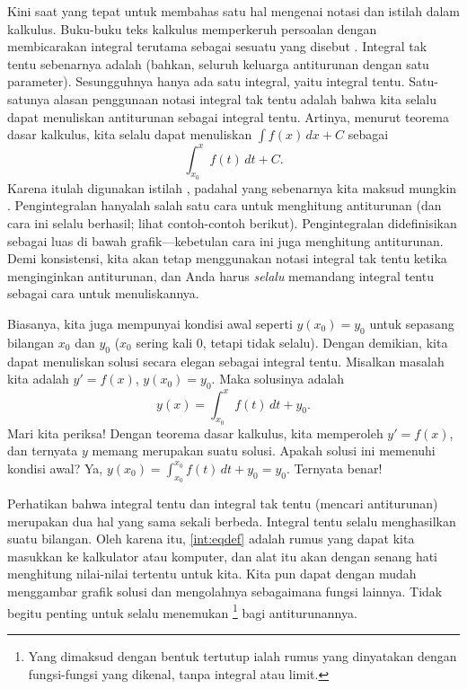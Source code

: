 Kini saat yang tepat untuk membahas satu hal mengenai
notasi dan istilah dalam kalkulus. Buku-buku teks kalkulus
memperkeruh persoalan dengan membicarakan integral terutama sebagai sesuatu
yang disebut . Integral tak tentu
sebenarnya adalah \emph{}
(bahkan, seluruh keluarga antiturunan
dengan satu parameter). Sesungguhnya hanya ada satu integral, yaitu
integral tentu.
Satu-satunya alasan penggunaan notasi integral tak tentu adalah bahwa kita selalu dapat
menuliskan antiturunan sebagai integral tentu. Artinya, menurut teorema dasar
kalkulus, kita selalu dapat menuliskan
$\int f(x) \,dx + C$ sebagai
\begin{equation*}
\int_{x_0}^x f(t) \,dt + C .
\end{equation*}
Karena itulah digunakan istilah \emph{}, padahal yang sebenarnya kita maksud mungkin
\emph{}.
Pengintegralan hanyalah salah satu cara untuk menghitung
antiturunan (dan cara ini selalu berhasil; lihat
contoh-contoh berikut). Pengintegralan didefinisikan sebagai luas di bawah grafik---kebetulan
cara ini juga menghitung antiturunan.
Demi konsistensi, kita akan tetap menggunakan
notasi integral tak tentu ketika menginginkan antiturunan,
dan Anda harus \emph{selalu} memandang integral tentu
sebagai cara untuk menuliskannya.

Biasanya, kita juga mempunyai kondisi awal seperti $y(x_0) = y_0$
untuk sepasang bilangan $x_0$ dan $y_0$ ($x_0$ sering kali 0, tetapi tidak selalu).
Dengan demikian, kita dapat menuliskan solusi secara elegan sebagai integral tentu.
Misalkan masalah kita adalah $y' = f(x)$, $y(x_0) = y_0$. Maka solusinya adalah
\begin{equation} \label{int:eqdef}
y(x) = \int_{x_0}^x f(t) \,dt + y_0 .
\end{equation}
Mari kita periksa!
Dengan teorema dasar kalkulus, kita memperoleh
$y' = f(x)$, dan ternyata $y$ memang merupakan suatu
solusi. Apakah solusi ini memenuhi kondisi awal? Ya,
$y(x_0) = \int_{x_0}^{x_0} f(t)\,dt + y_0 = y_0$. Ternyata benar!

Perhatikan bahwa integral tentu dan integral tak tentu
(mencari antiturunan) merupakan dua hal yang sama sekali berbeda. Integral tentu
selalu menghasilkan suatu bilangan. Oleh karena itu, \eqref{int:eqdef} adalah rumus yang dapat
kita masukkan ke kalkulator atau komputer, dan alat itu akan dengan senang hati menghitung
nilai-nilai tertentu untuk kita. Kita pun dapat dengan mudah menggambar grafik
solusi dan mengolahnya sebagaimana fungsi lainnya.
Tidak begitu penting untuk selalu menemukan
\footnote{Yang dimaksud dengan bentuk tertutup ialah rumus yang dinyatakan dengan
fungsi-fungsi yang dikenal, tanpa integral atau limit.}
bagi antiturunannya.

